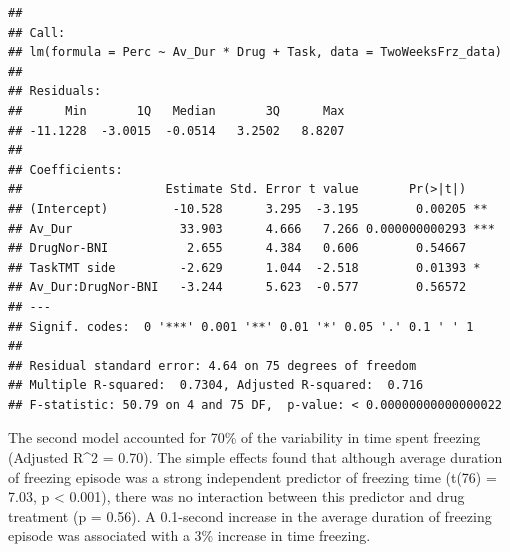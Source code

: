 \documentclass[
]{book}
\begin{document}
\begin{verbatim}
## 
## Call:
## lm(formula = Perc ~ Av_Dur * Drug + Task, data = TwoWeeksFrz_data)
## 
## Residuals:
##      Min       1Q   Median       3Q      Max 
## -11.1228  -3.0015  -0.0514   3.2502   8.8207 
## 
## Coefficients:
##                    Estimate Std. Error t value       Pr(>|t|)    
## (Intercept)         -10.528      3.295  -3.195        0.00205 ** 
## Av_Dur               33.903      4.666   7.266 0.000000000293 ***
## DrugNor-BNI           2.655      4.384   0.606        0.54667    
## TaskTMT side         -2.629      1.044  -2.518        0.01393 *  
## Av_Dur:DrugNor-BNI   -3.244      5.623  -0.577        0.56572    
## ---
## Signif. codes:  0 '***' 0.001 '**' 0.01 '*' 0.05 '.' 0.1 ' ' 1
## 
## Residual standard error: 4.64 on 75 degrees of freedom
## Multiple R-squared:  0.7304, Adjusted R-squared:  0.716 
## F-statistic: 50.79 on 4 and 75 DF,  p-value: < 0.00000000000000022
\end{verbatim}

The second model accounted for 70\% of the variability in time spent freezing (Adjusted R\^{}2 = 0.70). The simple effects found that although average duration of freezing episode was a strong independent predictor of freezing time (t(76) = 7.03, p \textless{} 0.001), there was no interaction between this predictor and drug treatment (p = 0.56). A 0.1-second increase in the average duration of freezing episode was associated with a 3\% increase in time freezing.

  
\end{document}
